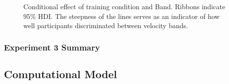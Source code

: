 \documentclass[
  12pt,
  letterpaper,
]{article}
\begin{document}
\begin{figure}


\caption{\label{fig-e3-bmm-vx}Conditional effect of training condition
and Band. Ribbons indicate 95\% HDI. The steepness of the lines serves
as an indicator of how well participants discriminated between velocity
bands.}

\end{figure}%

\subsubsection{Experiment 3 Summary}\label{experiment-3-summary}

\subsection{Computational Model}\label{computational-model-1}
\end{document}
